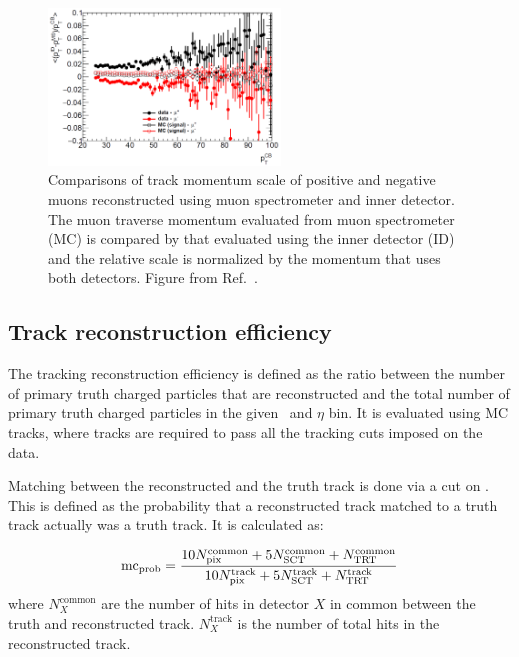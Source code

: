 \begin{figure}[h]
\centering
\includegraphics[width=0.55\textwidth]{figures/main/corrections/MuonPerf.pdf}
\caption{Comparisons of track momentum scale of positive and negative muons reconstructed using muon spectrometer and inner detector.
The muon traverse momentum evaluated from muon spectrometer (MC) is compared by that evaluated using the inner detector (ID) and the relative scale is normalized by the momentum that uses both detectors.
Figure from Ref.~\cite{Bold:2194917}.}
\label{fig:ChMomentumScale}
\end{figure}


\subsection{Track reconstruction efficiency}
\label{sec:trackreco}

The tracking reconstruction efficiency is defined as the ratio between the number of primary truth charged particles that are reconstructed and the total number of primary truth charged particles in the given \pt\ and $\eta$ bin.
It is evaluated using MC tracks, where tracks are required to pass all the tracking cuts imposed on the data.

Matching between the reconstructed and the truth track is done via a cut on \mcprob.
This is defined as the probability that a reconstructed track matched to a truth track actually was a truth track.
It is calculated as:

\begin{align}
\mbox{${\mathrm{mc}}_{\mathrm{prob}}$} = \frac{10N^{\mathrm{common}}_{\mathrm{pix}} + 5N^{\mathrm{common}}_{\mathrm{SCT}} + N^{\mathrm{common}}_{\mathrm{TRT}}}{10N^{\mathrm{track}}_{\mathrm{pix}} + 5 N^{\mathrm{track}}_{\mathrm{SCT}} + N^{\mathrm{track}}_{\mathrm{TRT}}}
\end{align}
where $N^{\mathrm{common}}_X$  are the number of hits in detector $X$ in common between the truth and reconstructed track.
$N^{\mathrm{track}}_X$ is the number of total hits in the reconstructed track.

